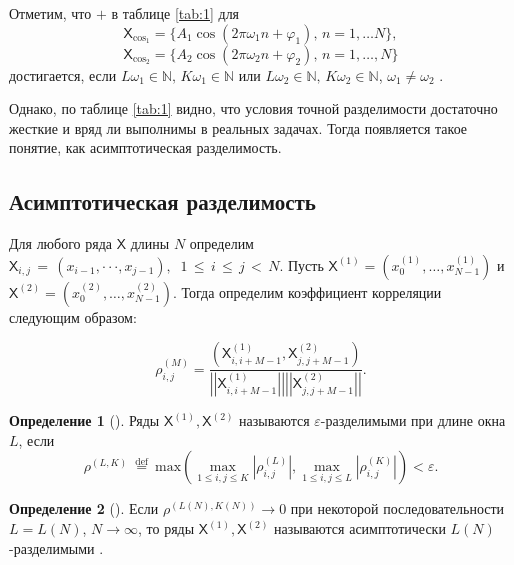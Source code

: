 \documentclass[12pt, specialist, subf
]{disser}
\theoremstyle{definition}
\newcommand{\TS}{\mathsf{X}}
\newtheorem{definition}{Определение} %
\begin{document}
Отметим, что $+$ в таблице \ref{tab:1} для \[\TS_{\cos_1} = \{A_1 \cos\left(2 \pi{\omega_1} n + \varphi_1\right), \, n = 1, \dots N \},\]
\[\TS_{\cos_2} = \{A_2 \cos\left(2 \pi{\omega_2} n + \varphi_2\right), \, n = 1, \dots, N\}\] достигается, если $L\omega_1 \in \mathbb{N}, \, K\omega_1 \in \mathbb{N}$ или $L\omega_2 \in \mathbb{N}, \, K\omega_2 \in \mathbb{N}$, $\omega_1 \not = \omega_2$ \cite{golyandina2001analysis}.

Однако, по таблице \ref{tab:1} видно, что условия точной разделимости достаточно жесткие и вряд ли выполнимы в реальных задачах. Тогда появляется такое понятие, как асимптотическая разделимость.

\subsection{Асимптотическая разделимость}

Для любого ряда $\TS$ длины $N$ определим
$\TS_{i,j}\,=\,(x_{i-1},\cdot\cdot\cdot,x_{j-1}),\;\;1\,\leq\,i\,\leq\,j\,<\,N.$
Пусть $\TS^{(1)}=(x_{0}^{(1)}, \ldots, x_{N-1}^{(1)})$ и $ \TS^{(2)}=(x_{0}^{(2)}, \ldots,x_{N-1}^{(2)}).$ Тогда определим коэффициент корреляции следующим образом:


\begin{equation*}
	\rho_{i,j}^{(M)}=\frac{\left(\TS_{i,i+M-1}^{(1)},\TS_{j,j+M-1}^{(2)}\right)}{\left|\left|\TS_{i,i+M-1}^{(1)}\right|\right|\left|\left|\TS_{j,j+M-1}^{(2)}\right|\right|}.
\end{equation*}

\begin{definition}[\cite{golyandina2001analysis}]
	Ряды $\TS^{(1)}, \TS^{(2)}$ называются $\varepsilon$-разделимыми при длине окна $L$, если
	\begin{equation*}
		\rho^{(L,K)}\ {\stackrel{\mathrm{def}}{=}}\ \mathrm{max}\left(\operatorname*{max}_{1\leq i,j\leq K}|\rho_{i,j}^{(L)}|,\operatorname*{max}_{1\leq i,j\leq L}|\rho_{i,j}^{(K)}|\right)<\varepsilon
		\text{.}
	\end{equation*}

\end{definition}

\begin{definition}[\cite{golyandina2001analysis}]
	Если $\rho^{(L(N),K(N))} \rightarrow 0$ при некоторой последовательности $L = L(N) $, $N \rightarrow \infty$, то ряды $\TS^{(1)}, \TS^{(2)}$ называются асимптотически $L(N)$-разделимыми .
\end{definition}
\end{document}
